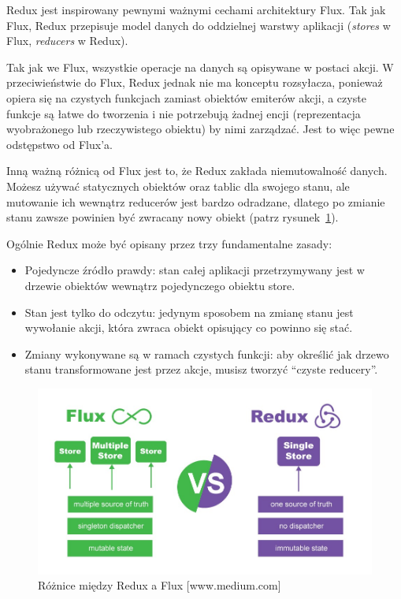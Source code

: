 Redux jest inspirowany pewnymi ważnymi cechami architektury Flux.
Tak jak Flux, Redux przepisuje model danych do oddzielnej warstwy aplikacji
(\textit{stores} w Flux, \textit{reducers} w Redux).

Tak jak we Flux, wszystkie operacje na danych są opisywane w postaci akcji.
W przeciwieństwie do Flux, Redux jednak nie ma konceptu rozsyłacza,
ponieważ opiera się na czystych funkcjach zamiast obiektów emiterów akcji,
a czyste funkcje są łatwe do tworzenia i nie potrzebują żadnej encji
(reprezentacja wyobrażonego lub rzeczywistego obiektu) by nimi zarządzać.
Jest to więc pewne odstępstwo od Flux’a.
~\cite{www_nafrontendzie}

Inną ważną różnicą od Flux jest to, że Redux zakłada niemutowalność danych.
Możesz używać statycznych obiektów oraz tablic dla swojego stanu,
ale mutowanie ich wewnątrz reducerów jest bardzo odradzane,
dlatego po zmianie stanu zawsze powinien być zwracany nowy obiekt (patrz rysunek~\ref{rys:reduxFlux}).

Ogólnie Redux może być opisany przez trzy fundamentalne zasady:
\begin{itemize}
	\item Pojedyncze źródło prawdy: stan całej aplikacji przetrzymywany jest
	w drzewie obiektów wewnątrz pojedynczego obiektu store.
	\item Stan jest tylko do odczytu: jedynym sposobem na zmianę stanu jest wywołanie akcji,
	która zwraca obiekt opisujący co powinno się stać.
	\item Zmiany wykonywane są w ramach czystych funkcji: aby określić jak drzewo stanu
	transformowane jest przez akcje, musisz tworzyć ``czyste reducery''.
\end{itemize}

\begin{figure}
	\centering\includegraphics[width=\textwidth]{img/reduxFlux.jpeg}
	\caption{Różnice między Redux a Flux [www.medium.com]}\label{rys:reduxFlux}%
\end{figure}

